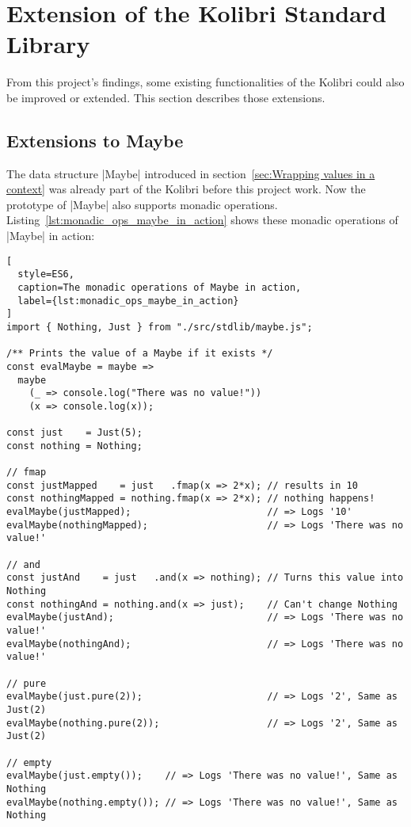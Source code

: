 \section{Extension of the Kolibri Standard Library}
\label{sec:Extension of the Kolibri Standard Library}
From this project's findings, some existing functionalities of the Kolibri
could also be improved or extended. This section describes those extensions.

\subsection{Extensions to Maybe} %
\label{sub:Extensions to Maybe}
The data structure |Maybe| introduced in section~\ref{sec:Wrapping values in a
context} was already part of the Kolibri before this project work. Now the
prototype of |Maybe| also supports monadic operations.\\
Listing~\ref{lst:monadic_ops_maybe_in_action} shows these monadic operations of
|Maybe| in action:

\begin{lstlisting}[
  style=ES6,
  caption=The monadic operations of Maybe in action,
  label={lst:monadic_ops_maybe_in_action}
]
import { Nothing, Just } from "./src/stdlib/maybe.js";

/** Prints the value of a Maybe if it exists */
const evalMaybe = maybe =>
  maybe
    (_ => console.log("There was no value!"))
    (x => console.log(x));

const just    = Just(5);
const nothing = Nothing;

// fmap 
const justMapped    = just   .fmap(x => 2*x); // results in 10
const nothingMapped = nothing.fmap(x => 2*x); // nothing happens!
evalMaybe(justMapped);                        // => Logs '10'
evalMaybe(nothingMapped);                     // => Logs 'There was no value!' 

// and
const justAnd    = just   .and(x => nothing); // Turns this value into Nothing
const nothingAnd = nothing.and(x => just);    // Can't change Nothing
evalMaybe(justAnd);                           // => Logs 'There was no value!'
evalMaybe(nothingAnd);                        // => Logs 'There was no value!' 

// pure
evalMaybe(just.pure(2));                      // => Logs '2', Same as Just(2)
evalMaybe(nothing.pure(2));                   // => Logs '2', Same as Just(2)

// empty
evalMaybe(just.empty());    // => Logs 'There was no value!', Same as Nothing
evalMaybe(nothing.empty()); // => Logs 'There was no value!', Same as Nothing
\end{lstlisting}

